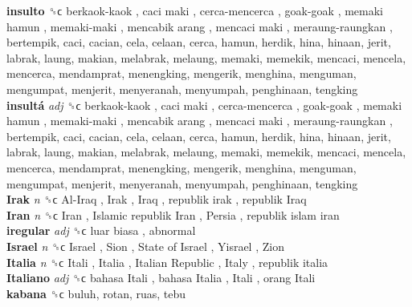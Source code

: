 \textbf{insulto} ␝ϲ   berkaok-kaok ,  caci maki ,  cerca-mencerca ,  goak-goak ,  memaki hamun ,  memaki-maki ,  mencabik arang ,  mencaci maki ,  meraung-raungkan , bertempik, caci, cacian, cela, celaan, cerca, hamun, herdik, hina, hinaan, jerit, labrak, laung, makian, melabrak, melaung, memaki, memekik, mencaci, mencela, mencerca, mendamprat, menengking, mengerik, menghina, menguman, mengumpat, menjerit, menyeranah, menyumpah, penghinaan, tengking  \\
\textbf{insultá} \emph{adj}  ␝ϲ   berkaok-kaok ,  caci maki ,  cerca-mencerca ,  goak-goak ,  memaki hamun ,  memaki-maki ,  mencabik arang ,  mencaci maki ,  meraung-raungkan , bertempik, caci, cacian, cela, celaan, cerca, hamun, herdik, hina, hinaan, jerit, labrak, laung, makian, melabrak, melaung, memaki, memekik, mencaci, mencela, mencerca, mendamprat, menengking, mengerik, menghina, menguman, mengumpat, menjerit, menyeranah, menyumpah, penghinaan, tengking  \\
\textbf{Irak} \emph{n}  ␝ϲ   Al-Iraq ,  Irak ,  Iraq ,  republik irak ,  republik Iraq   \\
\textbf{Iran} \emph{n}  ␝ϲ   Iran ,  Islamic republik Iran ,  Persia ,  republik islam iran   \\
\textbf{iregular} \emph{adj}  ␝ϲ   luar biasa , abnormal  \\
\textbf{Israel} \emph{n}  ␝ϲ   Israel ,  Sion ,  State of Israel ,  Yisrael ,  Zion   \\
\textbf{Italia} \emph{n}  ␝ϲ   Itali ,  Italia ,  Italian Republic ,  Italy ,  republik italia   \\
\textbf{Italiano} \emph{adj}  ␝ϲ   bahasa Itali ,  bahasa Italia ,  Itali ,  orang Itali   \\
\textbf{kabana} ␝ϲ  buluh, rotan, ruas, tebu  \\
